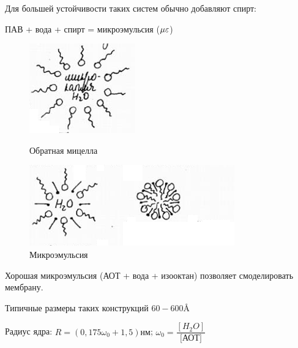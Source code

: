 \begin{lecture}
\begin{lecSection}
\begin{flushleft}
		\par Для большей устойчивости таких систем обычно добавляют спирт:
		\par ПАВ + вода + спирт = микроэмульсия ($\Large \mu \varepsilon \normalsize$)
			\begin{figure}[H]
			\begin{minipage}[h]{0.2\linewidth}
				\centering\includegraphics[width=\linewidth]{lecture_07/pic7}
				\caption{Обратная мицелла}
			\end{minipage}
			\hfill
			\begin{minipage}[h]{0.7\linewidth}
				\centering\includegraphics[width=\linewidth]{lecture_07/pic8}
				\caption{Микроэмульсия}
			\end{minipage}
			\hfill
			\end{figure}
		\par Хорошая микроэмульсия (АОТ + вода + изооктан) позволяет смоделировать мембрану.
		\par Типичные размеры таких конструкций $60-600\text{Å}$
		\par Радиус ядра: $R =  (0,175\omega_0 + 1,5)\text{нм}$; $\omega_0 = \dfrac{[H_2O]}{\text{[АОТ]}}$
	\end{flushleft}
	\end{lecSection}


\end{lecture}
